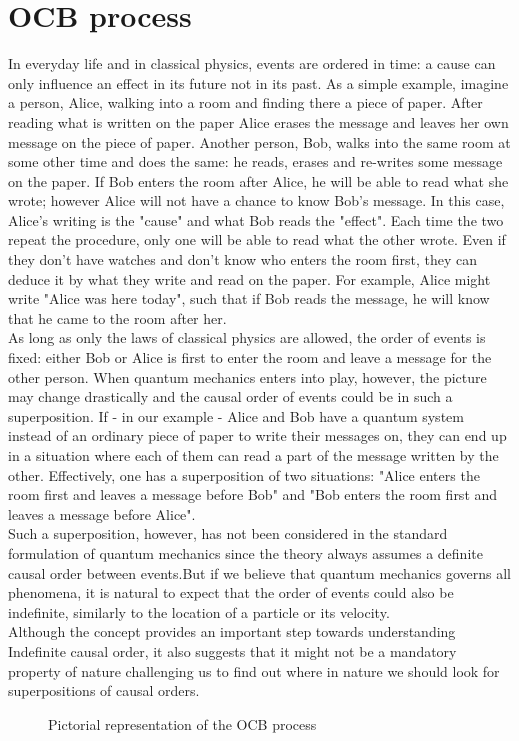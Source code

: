 \section{OCB process}
In everyday life and in classical physics, events are ordered in time: a cause can only influence an effect in its future not in its past. As a simple example, imagine a person, Alice, walking into a room and finding there a piece of paper. After reading what is written on the paper Alice erases the message and leaves her own message on the piece of paper. Another person, Bob, walks into the same room at some other time and does the same: he reads, erases and re-writes some message on the paper. If Bob enters the room after Alice, he will be able to read what she wrote; however Alice will not have a chance to know Bob's message. In this case, Alice's writing is the "cause" and what Bob reads the "effect". Each time the two repeat the procedure, only one will be able to read what the other wrote. Even if they don't have watches and don't know who enters the room first, they can deduce it by what they write and read on the paper. For example, Alice might write "Alice was here today", such that if Bob reads the message, he will know that he came to the room after her.\\
As long as only the laws of classical physics are allowed, the order of events is fixed: either Bob or Alice is first to enter the room and leave a message for the other person. When quantum mechanics enters into play, however, the picture may change drastically and the causal order of events could be in such a superposition. If - in our example - Alice and Bob have a quantum system instead of an ordinary piece of paper to write their messages on, they can end up in a situation where each of them can read a part of the message written by the other. Effectively, one has a superposition of two situations: "Alice enters the room first and leaves a message before Bob" and "Bob enters the room first and leaves a message before Alice".\\
Such a superposition, however, has not been considered in the standard formulation of quantum mechanics since the theory always assumes a definite causal order between events.But if we believe that quantum mechanics governs all phenomena, it is natural to expect that the order of events could also be indefinite, similarly to the location of a particle or its velocity.\\
Although the concept provides an important step towards understanding Indefinite causal order, it also suggests that it might not be a mandatory property of nature challenging us to find out where in nature we should look for superpositions of causal orders.
\begin{figure}[htp]
\centering
{}
\caption{\footnotesize{Pictorial representation of the OCB process}}
\label{eval_theta_modW}
\end{figure}
